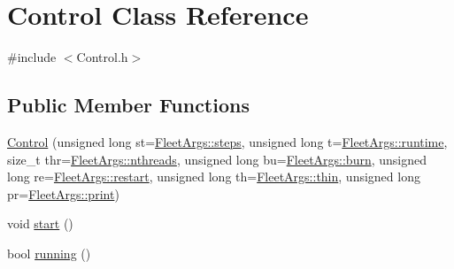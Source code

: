 \hypertarget{struct_control}{}\section{Control Class Reference}
\label{struct_control}


{\ttfamily \#include $<$Control.\+h$>$}

\subsection*{Public Member Functions}
\begin{DoxyCompactItemize}
\item 
\hyperlink{struct_control_a1403ae58ef8c681793bd3d94b3f3e704}{Control} (unsigned long st=\hyperlink{namespace_fleet_args_a0cabfaa21ab6740518265b14df5948c7}{Fleet\+Args\+::steps}, unsigned long t=\hyperlink{namespace_fleet_args_a094bc8aa2836c57906405cde03d24fc6}{Fleet\+Args\+::runtime}, size\+\_\+t thr=\hyperlink{namespace_fleet_args_a90ee834a1804002baec2366daeda54a5}{Fleet\+Args\+::nthreads}, unsigned long bu=\hyperlink{namespace_fleet_args_a7dc1ce66659f9dc509b370d5660582e8}{Fleet\+Args\+::burn}, unsigned long re=\hyperlink{namespace_fleet_args_af0c62e1528330a5fb0ba9f01082aa823}{Fleet\+Args\+::restart}, unsigned long th=\hyperlink{namespace_fleet_args_add2603eb3b9b47d79684e1a12bcca2aa}{Fleet\+Args\+::thin}, unsigned long pr=\hyperlink{namespace_fleet_args_acf2f80bb2810cea3b3eeef0c4b0edf03}{Fleet\+Args\+::print})
\item 
void \hyperlink{struct_control_a933994a3524f2f6d7ef0a17086e7cf66}{start} ()
\item 
bool \hyperlink{struct_control_a9217475a8ad619e7360524ae49c559a7}{running} ()
\end{DoxyCompactItemize}
